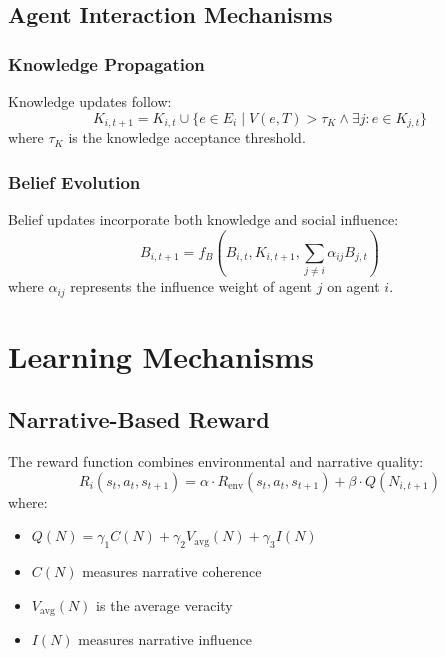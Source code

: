 \documentclass[12pt, a4paper]{article}
\begin{document}
\subsection{Agent Interaction Mechanisms}

\subsubsection{Knowledge Propagation}
Knowledge updates follow:
\begin{equation}
    K_{i,t+1} = K_{i,t} \cup \{e \in E_i \mid V(e, T) > \tau_K \land \exists j: e \in K_{j,t}\}
\end{equation}
where $\tau_K$ is the knowledge acceptance threshold.

\subsubsection{Belief Evolution}
Belief updates incorporate both knowledge and social influence:
\begin{equation}
    B_{i,t+1} = f_B(B_{i,t}, K_{i,t+1}, \sum_{j \neq i} \alpha_{ij} B_{j,t})
\end{equation}
where $\alpha_{ij}$ represents the influence weight of agent $j$ on agent $i$.

\section{Learning Mechanisms}

\subsection{Narrative-Based Reward}
The reward function combines environmental and narrative quality:
\begin{equation}
    R_i(s_t, a_t, s_{t+1}) = \alpha \cdot R_{\text{env}}(s_t, a_t, s_{t+1}) + \beta \cdot Q(N_{i,t+1})
\end{equation}
where:
\begin{itemize}
    \item $Q(N) = \gamma_1 C(N) + \gamma_2 V_{\text{avg}}(N) + \gamma_3 I(N)$
    \item $C(N)$ measures narrative coherence
    \item $V_{\text{avg}}(N)$ is the average veracity
    \item $I(N)$ measures narrative influence
\end{itemize}
\end{document}

